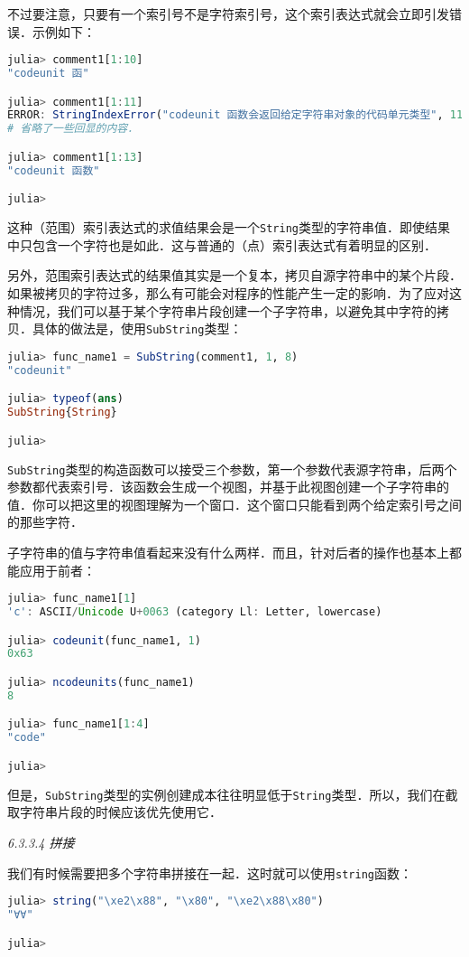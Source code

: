 不过要注意，只要有一个索引号不是字符索引号，这个索引表达式就会立即引发错误．示例如下：
\begin{lstlisting}[language=julia]
julia> comment1[1:10]
"codeunit 函"

julia> comment1[1:11]
ERROR: StringIndexError("codeunit 函数会返回给定字符串对象的代码单元类型", 11)
# 省略了一些回显的内容．

julia> comment1[1:13]
"codeunit 函数"

julia> 
\end{lstlisting}

这种（范围）索引表达式的求值结果会是一个\verb|String|类型的字符串值．即使结果中只包含一个字符也是如此．这与普通的（点）索引表达式有着明显的区别．

另外，范围索引表达式的结果值其实是一个复本，拷贝自源字符串中的某个片段．如果被拷贝的字符过多，那么有可能会对程序的性能产生一定的影响．为了应对这种情况，我们可以基于某个字符串片段创建一个子字符串，以避免其中字符的拷贝．具体的做法是，使用\verb|SubString|类型：
\begin{lstlisting}[language=julia]
julia> func_name1 = SubString(comment1, 1, 8)
"codeunit"

julia> typeof(ans)
SubString{String}

julia> 
\end{lstlisting}

\verb|SubString|类型的构造函数可以接受三个参数，第一个参数代表源字符串，后两个参数都代表索引号．该函数会生成一个视图，并基于此视图创建一个子字符串的值．你可以把这里的视图理解为一个窗口．这个窗口只能看到两个给定索引号之间的那些字符．

子字符串的值与字符串值看起来没有什么两样．而且，针对后者的操作也基本上都能应用于前者：
\begin{lstlisting}[language=julia]
julia> func_name1[1]
'c': ASCII/Unicode U+0063 (category Ll: Letter, lowercase)

julia> codeunit(func_name1, 1)
0x63

julia> ncodeunits(func_name1)
8

julia> func_name1[1:4]
"code"

julia> 
\end{lstlisting}

但是，\verb|SubString|类型的实例创建成本往往明显低于\verb|String|类型．所以，我们在截取字符串片段的时候应该优先使用它．

\textsl{6.3.3.4 拼接}

我们有时候需要把多个字符串拼接在一起．这时就可以使用\verb|string|函数：
\begin{lstlisting}[language=julia]
julia> string("\xe2\x88", "\x80", "\xe2\x88\x80")
"∀∀"

julia> 
\end{lstlisting}

